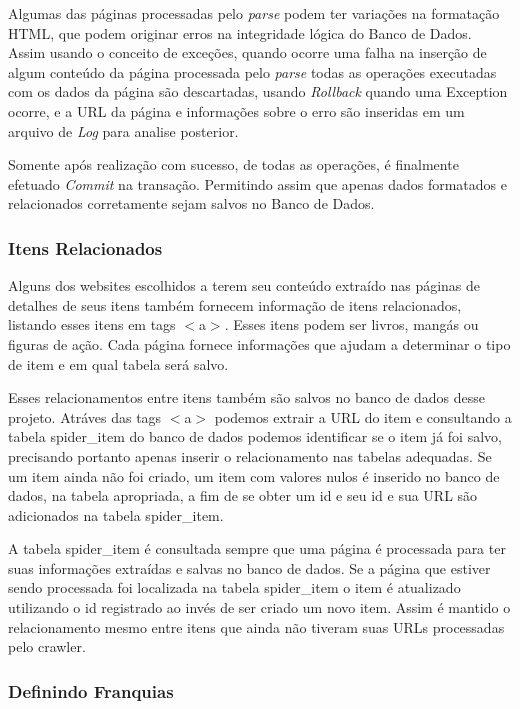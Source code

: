 \documentclass[12pt]{article}
\begin{document}
Algumas das páginas processadas pelo \textit{parse} podem ter variações na formatação HTML, que podem originar erros na integridade lógica do Banco de Dados. Assim usando o conceito de exceções, quando ocorre uma falha na inserção de algum conteúdo da página processada pelo \textit{parse} todas as operações executadas com os dados da página são descartadas, usando \textit{Rollback} quando uma Exception ocorre, e a URL da página e informações sobre o erro são inseridas em um arquivo de \textit{Log} para analise posterior.

Somente após realização com sucesso, de todas as operações, é finalmente efetuado \textit{Commit} na transação. Permitindo assim que apenas dados formatados e relacionados corretamente sejam salvos no Banco de Dados.

\subsubsection{Itens Relacionados}

Alguns dos websites escolhidos a terem seu conteúdo extraído nas páginas de detalhes de seus itens também fornecem informação de itens relacionados, listando esses itens em tags $<$a$>$. Esses itens podem ser livros, mangás ou figuras de ação. Cada página fornece informações que ajudam a determinar o tipo de item e em qual tabela será salvo.

Esses relacionamentos entre itens também são salvos no banco de dados desse projeto. Atráves das tags $<$a$>$ podemos extrair a URL do item e consultando a tabela spider\_item do banco de dados podemos identificar se o item já foi salvo, precisando portanto apenas inserir o relacionamento nas tabelas adequadas. Se um item ainda não foi criado, um item com valores nulos é inserido no banco de dados, na tabela apropriada, a fim de se obter um id e seu id e sua URL são adicionados na tabela spider\_item.

A tabela spider\_item é consultada sempre que uma página é processada para ter suas informações extraídas e salvas no banco de dados. Se a página que estiver sendo processada foi localizada na tabela spider\_item o item é atualizado utilizando o id registrado ao invés de ser criado um novo item. Assim é mantido o relacionamento mesmo entre itens que ainda não tiveram suas URLs processadas pelo crawler.

\subsubsection{Definindo Franquias}
\end{document}

